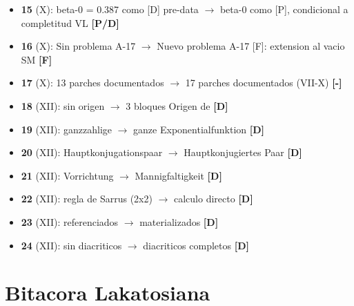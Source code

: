 ﻿\documentclass[11pt,letterpaper]{article}
\begin{document}
\begin{itemize}[leftmargin=*]
\item \textbf{15} (X): beta-0 = 0.387 como [D] pre-data $\rightarrow$ beta-0 como [P], condicional a completitud VL \textcolor{Ppurple}{\textbf{[P/D]}}
\item \textbf{16} (X): Sin problema A-17 $\rightarrow$ Nuevo problema A-17 [F]: extension al vacio SM \textcolor{Forange}{\textbf{[F]}}
\item \textbf{17} (X): 13 parches documentados $\rightarrow$ 17 parches documentados (VII-X) \textcolor{black}{\textbf{[-]}}
\item \textbf{18} (XII): sin origen $\rightarrow$ 3 bloques Origen de \textcolor{Dgreen}{\textbf{[D]}}
\item \textbf{19} (XII): ganzzahlige $\rightarrow$ ganze Exponentialfunktion \textcolor{Dgreen}{\textbf{[D]}}
\item \textbf{20} (XII): Hauptkonjugationspaar $\rightarrow$ Hauptkonjugiertes Paar \textcolor{Dgreen}{\textbf{[D]}}
\item \textbf{21} (XII): Vorrichtung $\rightarrow$ Mannigfaltigkeit \textcolor{Dgreen}{\textbf{[D]}}
\item \textbf{22} (XII): regla de Sarrus (2x2) $\rightarrow$ calculo directo \textcolor{Dgreen}{\textbf{[D]}}
\item \textbf{23} (XII): referenciados $\rightarrow$ materializados \textcolor{Dgreen}{\textbf{[D]}}
\item \textbf{24} (XII): sin diacriticos $\rightarrow$ diacriticos completos \textcolor{Dgreen}{\textbf{[D]}}
\end{itemize}

\newpage
\section*{Bitacora Lakatosiana}
\end{document}

